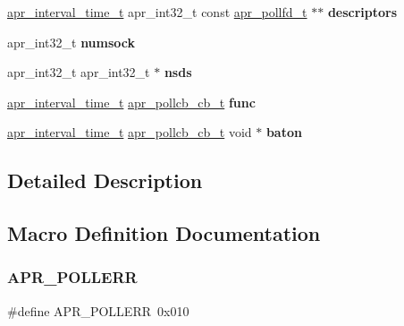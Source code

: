 \begin{DoxyCompactItemize}
\mbox{\hyperlink{group__apr__time_gaae2129185a395cc393f76fabf4f43e47}{apr\+\_\+interval\+\_\+time\+\_\+t}} apr\+\_\+int32\+\_\+t const \mbox{\hyperlink{structapr__pollfd__t}{apr\+\_\+pollfd\+\_\+t}} $\ast$$\ast$ {\bfseries descriptors}
\item 
\mbox{\label{group__apr__poll_ga1408ed4d6e2f3c9a2ab17fea618c5a6d}} 
apr\+\_\+int32\+\_\+t {\bfseries numsock}
\item 
\mbox{\label{group__apr__poll_ga4bc69a0e7bde2687820998e3ef6cb906}} 
apr\+\_\+int32\+\_\+t apr\+\_\+int32\+\_\+t $\ast$ {\bfseries nsds}
\item 
\mbox{\label{group__apr__poll_gac841e3104033ea020476bf7a06aa882c}} 
\mbox{\hyperlink{group__apr__time_gaae2129185a395cc393f76fabf4f43e47}{apr\+\_\+interval\+\_\+time\+\_\+t}} \mbox{\hyperlink{group__apr__poll_ga1dcd8c87e233dbf105e83d50ef601f55}{apr\+\_\+pollcb\+\_\+cb\+\_\+t}} {\bfseries func}
\item 
\mbox{\label{group__apr__poll_gafbe19e45631d6f40a439f57b08f7740c}} 
\mbox{\hyperlink{group__apr__time_gaae2129185a395cc393f76fabf4f43e47}{apr\+\_\+interval\+\_\+time\+\_\+t}} \mbox{\hyperlink{group__apr__poll_ga1dcd8c87e233dbf105e83d50ef601f55}{apr\+\_\+pollcb\+\_\+cb\+\_\+t}} void $\ast$ {\bfseries baton}
\end{DoxyCompactItemize}


\subsection{Detailed Description}


\subsection{Macro Definition Documentation}
\mbox{\label{group__apr__poll_ga6f5a72fd9cf3f5dcf174acce0b4b77ee}} 
\subsubsection{\texorpdfstring{A\+P\+R\+\_\+\+P\+O\+L\+L\+E\+RR}{APR\_POLLERR}}
{\footnotesize\ttfamily \#define A\+P\+R\+\_\+\+P\+O\+L\+L\+E\+RR~0x010}

